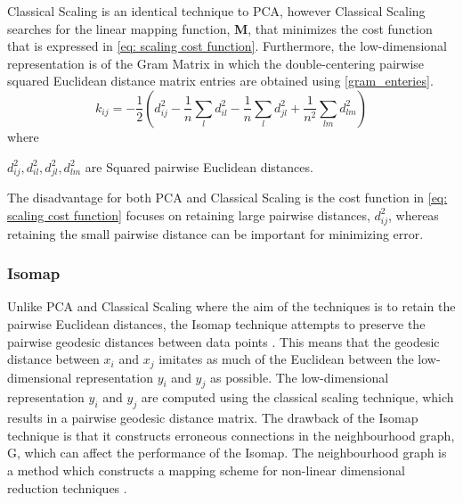 \documentclass[11pt,twocolumn]{witseiepaper}
\begin{document}
	Classical Scaling is an identical technique to PCA, however Classical Scaling searches for the linear mapping  function, \textbf{M}, that minimizes the cost function that is expressed in \eqref{eq: scaling cost function}. Furthermore, the low-dimensional representation is of the Gram Matrix in which the double-centering pairwise squared Euclidean distance matrix entries are obtained using \eqref{gram_enteries}.
	\begin{equation}
	k_{ij} = -\frac{1}{2}(d_{ij}^{2}-\frac{1}{n}\sum_{l}d_{il}^{2} - \frac{1}{n}\sum_{l}d_{jl}^{2} + \frac{1}{n^2}\sum_{lm}d_{lm}^{2})
	\label{gram_enteries}
	\end{equation}
	where 

	$d_{ij}^2, d_{il}^2, d_{jl}^2, d_{lm}^2$ are Squared pairwise Euclidean distances.
	
	The disadvantage for both PCA and Classical Scaling is the cost function in \eqref{eq: scaling cost function} focuses on retaining large pairwise distances, $d_{ij}^2$, whereas retaining the small pairwise distance can be important for minimizing error.
	
	\subsubsection{Isomap}
	Unlike PCA and Classical Scaling where the aim of the techniques is to retain the pairwise Euclidean distances, the Isomap technique attempts to preserve the pairwise geodesic distances between data points \cite{Zhang2012}. This means that the geodesic distance between $x_i$ and $x_j$ imitates as much of the Euclidean between the low-dimensional representation $y_i$ and $y_j$ as possible. The low-dimensional representation $y_i$ and $y_j$ are computed using the classical scaling technique, which results in a pairwise geodesic distance matrix. The drawback of the Isomap technique is that it constructs erroneous connections in the neighbourhood graph, G, which can affect the performance of the Isomap. The neighbourhood graph is a method which constructs a mapping scheme for non-linear dimensional reduction techniques \cite{Aeini2014}.
	
\end{document}
